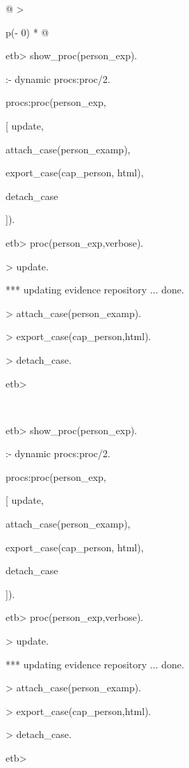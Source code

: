 \documentclass[12pt,twoside,a4paper]{article}
\begin{document}
\begin{longtable}[]{@{}
  >{\raggedright\arraybackslash}p{(\columnwidth - 0\tabcolsep) * }@{}}
\caption{\protect\hypertarget{_Ref175579287}{}{}Table 7 Running the person\_exp procedure}\tabularnewline
\toprule
\begin{minipage}[b]{\linewidth}\raggedright
etb\textgreater{} show\_proc(person\_exp).

:- dynamic procs:proc/2.

procs:proc(person\_exp,

{[} update,

attach\_case(person\_examp),

export\_case(cap\_person, html),

detach\_case

{]}).

etb\textgreater{} proc(person\_exp,verbose).

\textgreater{} update.

*** updating evidence repository ... done.

\textgreater{} attach\_case(person\_examp).

\textgreater{} export\_case(cap\_person,html).

\textgreater{} detach\_case.

etb\textgreater{}
\end{minipage} \\
\midrule
\endfirsthead
\toprule
\begin{minipage}[b]{\linewidth}\raggedright
etb\textgreater{} show\_proc(person\_exp).

:- dynamic procs:proc/2.

procs:proc(person\_exp,

{[} update,

attach\_case(person\_examp),

export\_case(cap\_person, html),

detach\_case

{]}).

etb\textgreater{} proc(person\_exp,verbose).

\textgreater{} update.

*** updating evidence repository ... done.

\textgreater{} attach\_case(person\_examp).

\textgreater{} export\_case(cap\_person,html).

\textgreater{} detach\_case.

etb\textgreater{}
\end{minipage} \\
\midrule
\endhead
\bottomrule
\end{longtable}
\end{document}
